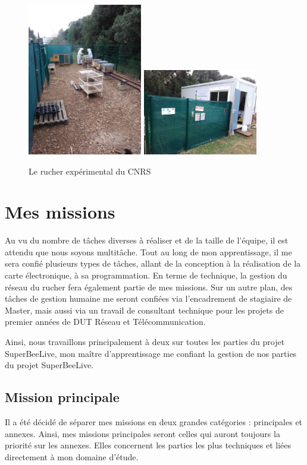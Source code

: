 \documentclass[11pt,french,a4paper]{report}
\begin{document}
{\begin{figure}[!h]
    \centering 
    \includegraphics[width=5cm]{./img/photo_ext_ruche.jpg} 
    \includegraphics[width=5cm]{./img/photo_ext_prefab.jpg}
    \caption{Le rucher expérimental du CNRS}
    \label{lieux_travail_princ}
\end{figure}


\chapter{Mes missions}
Au vu du nombre de tâches diverses à réaliser et de la taille de l'équipe, il est attendu que nous soyons multitâche. Tout 
au long de mon apprentissage, il me sera confié plusieurs types de tâches, allant de la conception à la réalisation de la 
carte électronique, à sa programmation. En terme de technique, la gestion du réseau du rucher fera également partie de mes missions.
Sur un autre plan, des tâches de gestion humaine me seront confiées via l'encadrement de stagiaire de Master, 
mais aussi via un travail de consultant technique pour les projets de premier années de DUT Réseau et Télécommunication. 

Ainsi, nous travaillons principalement à deux sur toutes les parties du projet SuperBeeLive, mon maître d'apprentissage me
confiant la gestion de nos parties du projet SuperBeeLive. 

\section{Mission principale}
Il a été décidé de séparer mes missions en deux grandes catégories : principales et annexes. Ainsi, mes missions principales 
seront celles qui auront toujours la priorité sur les annexes. Elles concernent les parties les plus techniques 
et liées directement à mon domaine d'étude. 


}
\end{document}
